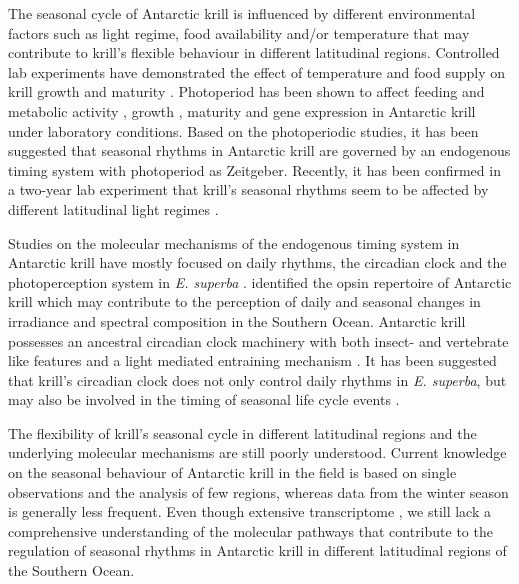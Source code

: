 The seasonal cycle of Antarctic krill is influenced by different environmental
factors such as light regime, food availability and/or temperature that may
contribute to krill's flexible behaviour in different latitudinal regions.
Controlled lab experiments have demonstrated the effect of temperature and food
supply on krill growth \citep{buchholz_moult_1991} and maturity
\citep{kawaguchi_learning_2007}.  Photoperiod has been shown to affect feeding
and metabolic activity \citep{teschke_simulated_2007}, growth
\citep{brown_long-term_2013}, maturity \citep{brown_flexible_2011} and gene
expression \citep{seear_effects_2009} in Antarctic krill under laboratory
conditions.  Based on the photoperiodic studies, it has been suggested that
seasonal rhythms in Antarctic krill are governed by an endogenous timing system
with photoperiod as Zeitgeber. Recently, it has been confirmed in a two-year
lab experiment that krill's seasonal rhythms seem to be affected by different
latitudinal light regimes \citep{horing_light_2018}.

Studies on the molecular mechanisms of the endogenous timing system in
Antarctic krill have mostly focused on daily rhythms, the circadian clock and
the photoperception system in \textit{E. superba} \citep{biscontin_opsin_2016,
biscontin_functional_2017, de_pitta_antarctic_2013,
piccolin_photoperiodic_2018}. \citet{biscontin_opsin_2016} identified the opsin
repertoire of Antarctic krill which may contribute to the perception of daily
and seasonal changes in irradiance and spectral composition in the Southern
Ocean. Antarctic krill possesses an ancestral circadian clock machinery with
both insect- and vertebrate like features and a light mediated entraining
mechanism \citep{biscontin_functional_2017}. It has been suggested that krill's
circadian clock does not only control daily rhythms in \textit{E.  superba},
but may also be involved in the timing of seasonal life cycle events
\citep{piccolin_seasonal_2018}.

The flexibility of krill's seasonal cycle in different latitudinal regions and
the underlying molecular mechanisms are still poorly understood. Current
knowledge on the seasonal behaviour of Antarctic krill in the field is based on
single observations and the analysis of few regions, whereas data from the
winter season is generally less frequent. Even though extensive transcriptome
\citep{meyer_pyrosequencing_2015, sales_krilldb:_2017}, we still lack a
comprehensive understanding of the molecular pathways that contribute to the
regulation of seasonal rhythms in Antarctic krill in different latitudinal
regions of the Southern Ocean. 

